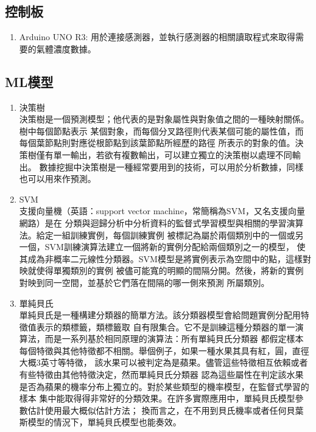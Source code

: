 	\subsection{控制板}
	\begin{enumerate}
		\item Arduino UNO R3: 用於連接感測器，並執行感測器的相關讀取程式來取得需要的氣體濃度數據。
	\end{enumerate}
	\subsection{ML模型}
	\begin{enumerate}
		\item 決策樹\\
			決策樹是一個預測模型；他代表的是對象屬性與對象值之間的一種映射關係。樹中每個節點表示
			某個對象，而每個分叉路徑則代表某個可能的屬性值，而每個葉節點則對應從根節點到該葉節點所經歷的路徑
			所表示的對象的值。決策樹僅有單一輸出，若欲有複數輸出，可以建立獨立的決策樹以處理不同輸出。
			數據挖掘中決策樹是一種經常要用到的技術，可以用於分析數據，同樣也可以用來作預測。 
		\item SVM\\
			支援向量機（英語：support vector machine，常簡稱為SVM，又名支援向量網路）是在
			分類與迴歸分析中分析資料的監督式學習模型與相關的學習演算法。給定一組訓練實例，每個訓練實例
			被標記為屬於兩個類別中的一個或另一個，SVM訓練演算法建立一個將新的實例分配給兩個類別之一的模型，
			使其成為非概率二元線性分類器。SVM模型是將實例表示為空間中的點，這樣對映就使得單獨類別的實例
			被儘可能寬的明顯的間隔分開。然後，將新的實例對映到同一空間，並基於它們落在間隔的哪一側來預測
			所屬類別。
		\item 單純貝氏\\
			單純貝氏是一種構建分類器的簡單方法。該分類器模型會給問題實例分配用特徵值表示的類標籤，類標籤取
			自有限集合。它不是訓練這種分類器的單一演算法，而是一系列基於相同原理的演算法：所有單純貝氏分類器
			都假定樣本每個特徵與其他特徵都不相關。舉個例子，如果一種水果其具有紅，圓，直徑大概3英寸等特徵，
			該水果可以被判定為是蘋果。儘管這些特徵相互依賴或者有些特徵由其他特徵決定，然而單純貝氏分類器
			認為這些屬性在判定該水果是否為蘋果的機率分布上獨立的。對於某些類型的機率模型，在監督式學習的樣本
			集中能取得得非常好的分類效果。在許多實際應用中，單純貝氏模型參數估計使用最大概似估計方法；
			換而言之，在不用到貝氏機率或者任何貝葉斯模型的情況下，單純貝氏模型也能奏效。
	\end{enumerate}